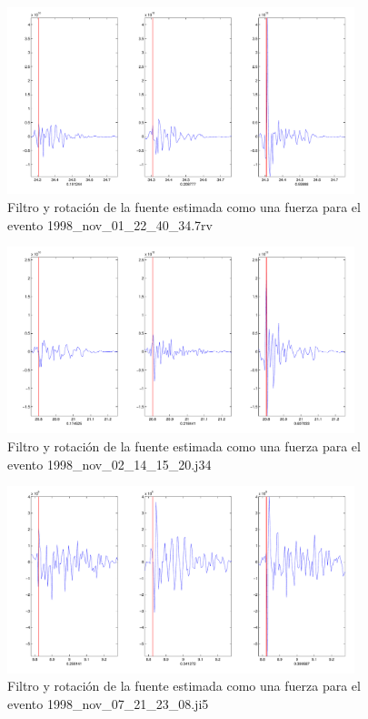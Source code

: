 \begin{figure}[H]
\includegraphics[width=0.9\textwidth,height=0.4\textheight]{linea_timerev/figuras/plotSrcEv13filtrotsrc.pdf}
\caption{Filtro y rotación de la fuente estimada como una fuerza para el
evento 1998\_nov\_01\_22\_40\_34.7rv}
\end{figure}
\begin{figure}[H]
\includegraphics[width=0.9\textwidth,height=0.4\textheight]{linea_timerev/figuras/plotSrcEv14filtrotsrc.pdf}
\caption{Filtro y rotación de la fuente estimada como una fuerza para el
evento 1998\_nov\_02\_14\_15\_20.j34}
\end{figure}
\begin{figure}[H]
\includegraphics[width=0.9\textwidth,height=0.4\textheight]{linea_timerev/figuras/plotSrcEv15filtrotsrc.pdf}
\caption{Filtro y rotación de la fuente estimada como una fuerza para el
evento 1998\_nov\_07\_21\_23\_08.ji5}
\end{figure}
